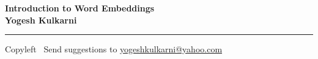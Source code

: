 
\graphicspath{{images/}}

\footnotesize


\begin{center}
\Large{\textbf{Introduction to Word Embeddings\\ Yogesh Kulkarni}}  
\end{center}

\begin{multicols}{2}
% 

\end{multicols}

\rule{\linewidth}{0.25pt}
\scriptsize
Copyleft \textcopyleft\  Send suggestions to 
\href{http://yati.io}{yogeshkulkarni@yahoo.com}


